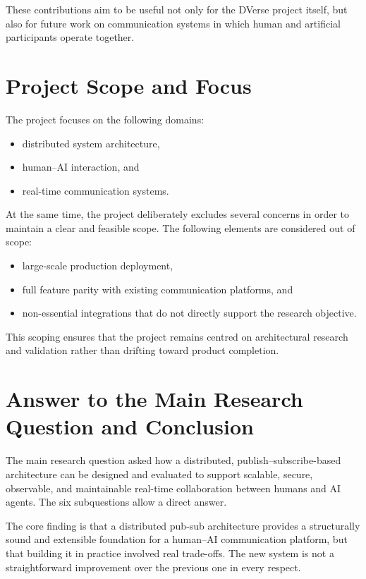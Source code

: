 \documentclass[11pt]{article}
\begin{document}
These contributions aim to be useful not only for the DVerse project itself, but also for future work on communication systems in which human and artificial participants operate together.

\section{Project Scope and Focus}

The project focuses on the following domains:

\begin{itemize}
    \item distributed system architecture,
    \item human--AI interaction, and
    \item real-time communication systems.
\end{itemize}

At the same time, the project deliberately excludes several concerns in order to maintain a clear and feasible scope. The following elements are considered out of scope:

\begin{itemize}
    \item large-scale production deployment,
    \item full feature parity with existing communication platforms, and
    \item non-essential integrations that do not directly support the research objective.
\end{itemize}

This scoping ensures that the project remains centred on architectural research and validation rather than drifting toward product completion.

\section{Answer to the Main Research Question and Conclusion}

The main research question asked how a distributed, publish--subscribe-based architecture can be designed and evaluated to support scalable, secure, observable, and maintainable real-time collaboration between humans and AI agents. The six subquestions allow a direct answer.

The core finding is that a distributed pub-sub architecture provides a structurally sound and extensible foundation for a human--AI communication platform, but that building it in practice involved real trade-offs. The new system is not a straightforward improvement over the previous one in every respect.
\end{document}
